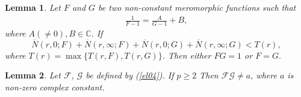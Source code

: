 \documentclass[a4paper,draft]{amsproc}
\theoremstyle{plain}
\newtheorem{lem}{Lemma}[section]
\theoremstyle{definition}
\theoremstyle{remark}
\newcommand{\ol}{\overline}
\newcommand{\beas}{\begin{eqnarray*}}
\newcommand{\eeas}{\end{eqnarray*}}
\numberwithin{equation}{section}
\begin{document}
\begin{lem}\label{l2}\cite{hxy0}
Let $F$ and $G$ be two non-constant meromorphic functions such that\\ \beas\displaystyle\frac{1}{F-1}=\frac{A}{G-1}+B,\eeas where $A(\ne0),B\in\mathbb{C}$. If
\begin{equation*}
\ol{N}(r,0; F)+	\ol{N}(r,\infty; F)+	\ol{N}(r,0; G)+	\ol{N}(r,\infty; G) < T(r),
\end{equation*} 
where $T(r)=\max\{T(r,F),T(r,G)\}$. Then either $FG=1$ or $F=G.$
\end{lem}
\begin{lem}\label{14}
Let $\mathcal{F}$, $\mathcal{G}$ be defined by (\ref{el04}). If $p \geq 2$
Then $\mathcal{F}\mathcal{G} \not= a$, where $a$ is non-zero complex constant.  
\end{lem}
\end{document}
